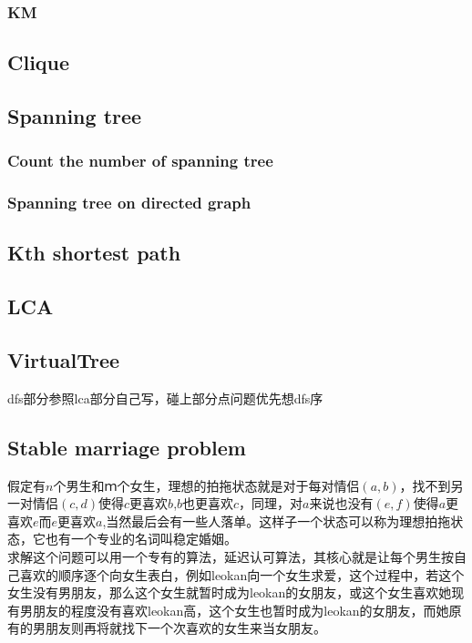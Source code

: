\subsubsection{KM}


\subsection{Clique}


\subsection{Spanning tree}
\subsubsection{Count the number of spanning tree}

\subsubsection{Spanning tree on directed graph}


\subsection{Kth shortest path}

\subsection{LCA}

\subsection{VirtualTree}
dfs部分参照lca部分自己写，碰上部分点问题优先想dfs序

\subsection{Stable marriage problem}
	假定有$n$个男生和$ｍ$个女生，理想的拍拖状态就是对于每对情侣$(a,b)$，找不到另一对情侣$(c,d)$使得$c$更喜欢$b$,$b$也更喜欢$c$，同理，对$a$来说也没有$(e,f)$使得$a$更喜欢$e$而$e$更喜欢$a$,当然最后会有一些人落单。这样子一个状态可以称为理想拍拖状态，它也有一个专业的名词叫稳定婚姻。\\
	求解这个问题可以用一个专有的算法，延迟认可算法，其核心就是让每个男生按自己喜欢的顺序逐个向女生表白，例如leokan向一个女生求爱，这个过程中，若这个女生没有男朋友，那么这个女生就暂时成为leokan的女朋友，或这个女生喜欢她现有男朋友的程度没有喜欢leokan高，这个女生也暂时成为leokan的女朋友，而她原有的男朋友则再将就找下一个次喜欢的女生来当女朋友。

